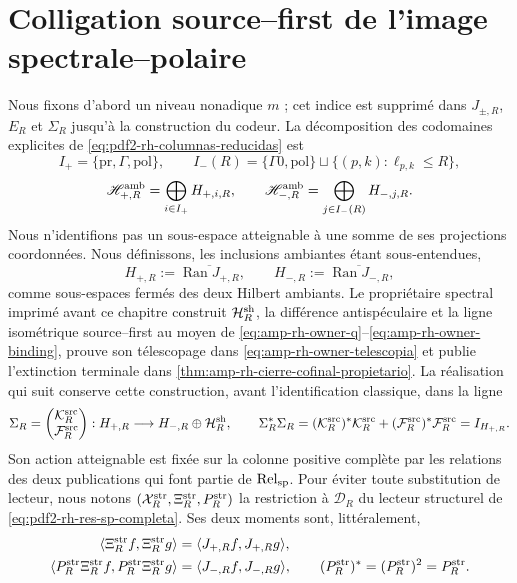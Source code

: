 \section{Colligation source--first de l'image spectrale--polaire}

Nous fixons d'abord un niveau nonadique \(m\) ; cet indice est supprimé dans
\(J_{\pm,R}\), \(E_R\) et \(\Sigma_R\) jusqu'à la construction du codeur. La
décomposition des codomaines explicites de
\eqref{eq:pdf2-rh-columnas-reducidas} est
\[
 I_+=\{\mathrm{pr},\Gamma,\mathrm{pol}\},\qquad
 I_-(R)=\{\Gamma0,\mathrm{pol}\}
 \sqcup\{(p,k):\ell_{p,k}\leq R\},
\]
\[
 \mathscr H_{+,R}^{\rm amb}=\bigoplus_{i\in I_+}H_{+,i,R},
 \qquad
 \mathscr H_{-,R}^{\rm amb}=\bigoplus_{j\in I_-(R)}H_{-,j,R}.
\]
Nous n'identifions pas un sous-espace atteignable à une somme de ses projections
coordonnées. Nous définissons, les inclusions ambiantes étant sous-entendues,
\[
 H_{+,R}:=\overline{\operatorname{Ran}J_{+,R}},\qquad
 H_{-,R}:=\overline{\operatorname{Ran}J_{-,R}},
\]
comme sous-espaces fermés des deux Hilbert ambiants. Le propriétaire
spectral imprimé avant ce chapitre construit
\(\mathcal H_R^{\rm sh}\), la différence antispéculaire et la ligne isométrique
source--first au moyen de
\eqref{eq:amp-rh-owner-q}--\eqref{eq:amp-rh-owner-binding}, prouve son
télescopage dans \eqref{eq:amp-rh-owner-telescopia} et publie l'extinction
terminale dans \cref{thm:amp-rh-cierre-cofinal-propietario}. La réalisation
qui suit conserve cette construction, avant l'identification classique,
dans la ligne
\begin{equation}\label{eq:pdf2-rh-coligacion-source-first}
 \Sigma_R=
 \begin{pmatrix}\mathcal K_R^{\rm src}\\ \mathcal F_R^{\rm src}\end{pmatrix}:
 H_{+,R}\longrightarrow
 H_{-,R}\oplus\mathcal H_R^{\rm sh},
 \qquad
 \Sigma_R^*\Sigma_R
 = (\mathcal K_R^{\rm src})^*\mathcal K_R^{\rm src}
  +(\mathcal F_R^{\rm src})^*\mathcal F_R^{\rm src}=I_{H_{+,R}}.
\end{equation}
Son action atteignable est fixée sur la colonne positive complète par
les relations des deux publications qui font partie de
\(\operatorname{Rel}_{\rm sp}\). Pour éviter toute substitution de lecteur,
nous notons
\((\mathcal X_R^{\rm str},\Xi_R^{\rm str},P_R^{\rm str})\) la restriction à
\(\mathcal D_R\) du lecteur structurel de
\eqref{eq:pdf2-rh-res-sp-completa}. Ses deux moments sont, littéralement,
\begin{equation}\label{eq:pdf2-rh-momentos-lector-estructural}
\begin{aligned}
 \langle\Xi_R^{\rm str}f,\Xi_R^{\rm str}g\rangle
  &=\langle J_{+,R}f,J_{+,R}g\rangle,\\
 \langle P_R^{\rm str}\Xi_R^{\rm str}f,
          P_R^{\rm str}\Xi_R^{\rm str}g\rangle
  &=\langle J_{-,R}f,J_{-,R}g\rangle,
 \qquad (P_R^{\rm str})^*= (P_R^{\rm str})^2=P_R^{\rm str}.
\end{aligned}
\end{equation}
